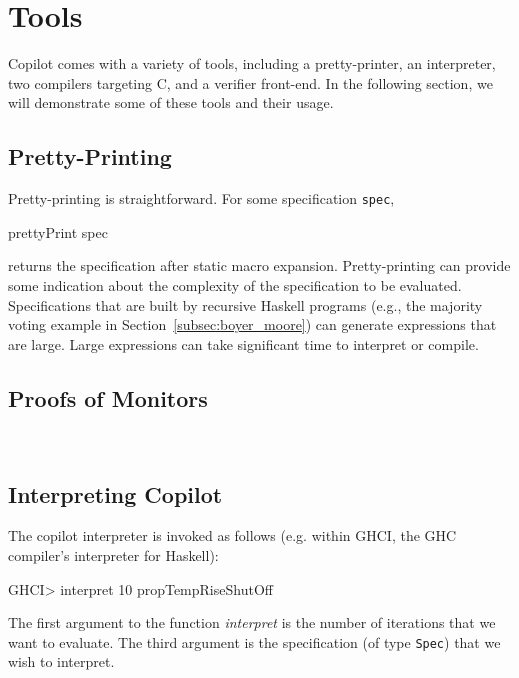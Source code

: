 \section{Tools} \label{sec:tools}

Copilot comes with a variety of tools, including a pretty-printer, an interpreter,
two compilers targeting C, and a verifier front-end. In the following section, we will
demonstrate some of these tools and their usage.

\subsection{Pretty-Printing} \label{sec:pretty-printing}
Pretty-printing is straightforward.  For some specification {\tt spec},
%
\begin{code}
prettyPrint spec
\end{code}
%
\noindent
returns the specification after static macro expansion.  Pretty-printing can
provide some indication about the complexity of the specification to be
evaluated.  Specifications that are built by recursive Haskell programs (e.g.,
the majority voting example in Section~\ref{subsec:boyer_moore}) can generate
expressions that are large.  Large expressions can take significant
time to interpret or compile.


\subsection{Proofs of Monitors}~\label{sec:proof} 



\subsection{Interpreting Copilot}

The copilot interpreter is invoked as follows (e.g. within GHCI, the GHC compiler's
interpreter for Haskell):
%
\begin{code}
GHCI> interpret 10 propTempRiseShutOff
\end{code}
%
The first argument to the function \emph{interpret} is the number of iterations that we want to evaluate.
The third argument is the specification (of type {\tt Spec}) that we wish to interpret.


